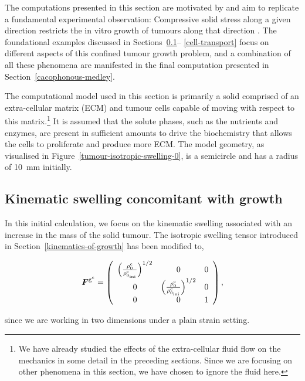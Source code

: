The computations presented in this section are motivated by and aim to
replicate a fundamental experimental observation: Compressive solid
stress along a given direction restricts the in vitro growth of
tumours along that direction \citep{jain1997}. The foundational
examples discussed in Sections~\ref{tumour-isotropic-swelling}--%
\ref{cell-transport} focus on different aspects of this confined
tumour growth problem, and a combination of all these phenomena are
manifested in the final computation presented in
Section~\ref{cacophonous-medley}.

The computational model used in this section is primarily a solid
comprised of an extra-cellular matrix (ECM) and tumour cells capable
of moving with respect to this matrix.\footnote{We have already
  studied the effects of the extra-cellular fluid flow on the
  mechanics in some detail in the preceding sections. Since we are
  focusing on other phenomena in this section, we have chosen to
  ignore the fluid here.} It is assumed that the solute
phases, such as the nutrients and enzymes, are present in sufficient
amounts to drive the biochemistry that allows the cells to proliferate
and produce more ECM. The model geometry, as visualised in
Figure~\ref{tumour-isotropic-swelling-0}, is a semicircle and has a
radius of 10~mm initially.

\subsection{Kinematic swelling concomitant with growth}
\label{tumour-isotropic-swelling}

In this initial calculation, we focus on the kinematic swelling
associated with an increase in the mass of the solid tumour. The
isotropic swelling tensor introduced in
Section~\ref{kinematics-of-growth} has been modified to,

\begin{equation}
\mbox{\boldmath$ F$}^{\mathrm{g}^{\mathrm{c}}} = \left(
\begin{array}{ccc}
\left(\frac{\rho_0^{\mathrm{c}}}
     {\rho_{0_{\mathrm{ini}}}^{\mathrm{c}}}\right)^{1/2} & 0 & 0 \\ 0
     & \left(\frac{\rho_0^{\mathrm{c}}}
     {\rho_{0_{\mathrm{ini}}}^{\mathrm{c}}}\right)^{1/2} & 0 \\ 0 & 0
     & 1 \end{array} \right),
\label{2d-isotropic}
\end{equation}

\noindent since we are working in two dimensions under a plain strain
setting.

